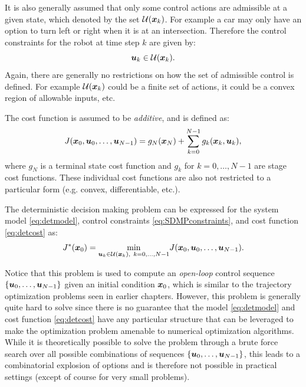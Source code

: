 It is also generally assumed that only some control actions are admissible at a given state, which denoted by the set $\mathcal{U}(\bm{x}_k)$. For example a car may only have an option to turn left or right when it is at an intersection.
Therefore the control constraints for the robot at time step $k$ are given by:
\begin{equation} \label{eq:SDMPconstraints}
\bm{u}_k \in \mathcal{U}(\bm{x}_k).
\end{equation}
Again, there are generally no restrictions on how the set of admissible control is defined. For example $\mathcal{U}(\bm{x}_k)$ could be a finite set of actions, it could be a convex region of allowable inputs, etc.

The cost function is assumed to be \textit{additive}, and is defined as:
\begin{equation} \label{eq:detcost}
J(\bm{x}_0, \bm{u}_0, \dots, \bm{u}_{N-1}) = g_N(\bm{x}_N) + \sum_{k=0}^{N-1} g_k(\bm{x}_k, \bm{u}_k),
\end{equation}
where $g_N$ is a terminal state cost function and $g_k$ for $k=0,\dots,N-1$ are stage cost functions. These individual cost functions are also not restricted to a particular form (e.g. convex, differentiable, etc.).

\begin{definition}
The deterministic decision making problem can be expressed for the system model \eqref{eq:detmodel}, control constraints \eqref{eq:SDMPconstraints}, and cost function \eqref{eq:detcost} as:
\begin{equation} \label{eq:dproblem}
J^*(\bm{x}_0) = \underset{\bm{u}_k \in \mathcal{U}(\bm{x}_k), \:\:k=0,\dots,N-1}{\min} J(\bm{x}_0, \bm{u}_0, \dots, \bm{u}_{N-1}).
\end{equation}
\end{definition}

Notice that this problem is used to compute an \textit{open-loop} control sequence $\{\bm{u}_0, \dots, \bm{u}_{N-1}\}$ given an initial condition $\bm{x}_0$, which is similar to the trajectory optimization problems seen in earlier chapters. 
However, this problem is generally quite hard to solve since there is no guarantee that the model \eqref{eq:detmodel} and cost function \eqref{eq:detcost} have any particular structure that can be leveraged to make the optimization problem amenable to numerical optimization algorithms. While it is theoretically possible to solve the problem through a brute force search over all possible combinations of sequences $\{\bm{u}_0, \dots, \bm{u}_{N-1}\}$, this leads to a combinatorial explosion of options and is therefore not possible in practical settings (except of course for very small problems).

